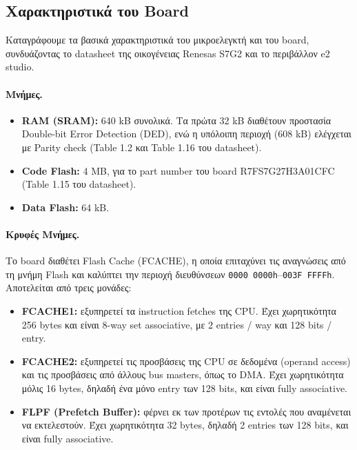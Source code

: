 \documentclass[12pt]{article}
\begin{document}
\subsection{Χαρακτηριστικά του Board}
Καταγράφουμε τα βασικά χαρακτηριστικά του μικροελεγκτή και του board, συνδυάζοντας το datasheet της οικογένειας Renesas S7G2 και το περιβάλλον e2 studio.

\paragraph{Μνήμες.}
\begin{itemize}
    \item \textbf{RAM (SRAM):} 640 kB συνολικά. Τα πρώτα 32 kB διαθέτουν προστασία Double-bit Error Detection (DED), ενώ η υπόλοιπη περιοχή (608 kB) ελέγχεται με Parity check (Table 1.2 και Table 1.16 του datasheet).
    \item \textbf{Code Flash:} 4 MB, για το part number του board R7FS7G27H3A01CFC (Table 1.15 του datasheet).
    \item \textbf{Data Flash:} 64 kB.
\end{itemize}

\paragraph{Κρυφές Μνήμες.}
Το board διαθέτει Flash Cache (FCACHE), η οποία επιταχύνει τις αναγνώσεις από τη μνήμη Flash
και καλύπτει την περιοχή διευθύνσεων \texttt{0000 0000h}--\texttt{003F FFFFh}. Αποτελείται
από τρεις μονάδες:

\begin{itemize}
    \item \textbf{FCACHE1:} εξυπηρετεί τα instruction fetches της CPU. Έχει χωρητικότητα
    256 bytes και είναι 8-way set associative, με 2 entries / way και 128 bits / entry.

    \item \textbf{FCACHE2:} εξυπηρετεί τις προσβάσεις της CPU σε δεδομένα (operand access)
    και τις προσβάσεις από άλλους bus masters, όπως το DMA. Έχει χωρητικότητα μόλις 16 bytes,
    δηλαδή ένα μόνο entry των 128 bits, και είναι fully associative.

    \item \textbf{FLPF (Prefetch Buffer):} φέρνει εκ των προτέρων τις εντολές που
    αναμένεται να εκτελεστούν. Έχει χωρητικότητα 32 bytes, δηλαδή 2 entries των 128 bits,
    και είναι fully associative.
\end{itemize}
\end{document}
